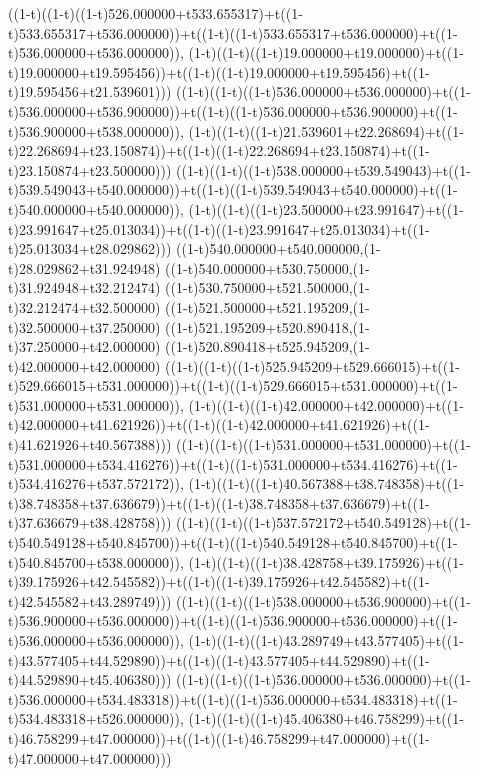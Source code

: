((1-t)((1-t)((1-t)526.000000+t533.655317)+t((1-t)533.655317+t536.000000))+t((1-t)((1-t)533.655317+t536.000000)+t((1-t)536.000000+t536.000000)),                                     (1-t)((1-t)((1-t)19.000000+t19.000000)+t((1-t)19.000000+t19.595456))+t((1-t)((1-t)19.000000+t19.595456)+t((1-t)19.595456+t21.539601)))
((1-t)((1-t)((1-t)536.000000+t536.000000)+t((1-t)536.000000+t536.900000))+t((1-t)((1-t)536.000000+t536.900000)+t((1-t)536.900000+t538.000000)),                                     (1-t)((1-t)((1-t)21.539601+t22.268694)+t((1-t)22.268694+t23.150874))+t((1-t)((1-t)22.268694+t23.150874)+t((1-t)23.150874+t23.500000)))
((1-t)((1-t)((1-t)538.000000+t539.549043)+t((1-t)539.549043+t540.000000))+t((1-t)((1-t)539.549043+t540.000000)+t((1-t)540.000000+t540.000000)),                                     (1-t)((1-t)((1-t)23.500000+t23.991647)+t((1-t)23.991647+t25.013034))+t((1-t)((1-t)23.991647+t25.013034)+t((1-t)25.013034+t28.029862)))
((1-t)540.000000+t540.000000,(1-t)28.029862+t31.924948)
((1-t)540.000000+t530.750000,(1-t)31.924948+t32.212474)
((1-t)530.750000+t521.500000,(1-t)32.212474+t32.500000)
((1-t)521.500000+t521.195209,(1-t)32.500000+t37.250000)
((1-t)521.195209+t520.890418,(1-t)37.250000+t42.000000)
((1-t)520.890418+t525.945209,(1-t)42.000000+t42.000000)
((1-t)((1-t)((1-t)525.945209+t529.666015)+t((1-t)529.666015+t531.000000))+t((1-t)((1-t)529.666015+t531.000000)+t((1-t)531.000000+t531.000000)),                                     (1-t)((1-t)((1-t)42.000000+t42.000000)+t((1-t)42.000000+t41.621926))+t((1-t)((1-t)42.000000+t41.621926)+t((1-t)41.621926+t40.567388)))
((1-t)((1-t)((1-t)531.000000+t531.000000)+t((1-t)531.000000+t534.416276))+t((1-t)((1-t)531.000000+t534.416276)+t((1-t)534.416276+t537.572172)),                                     (1-t)((1-t)((1-t)40.567388+t38.748358)+t((1-t)38.748358+t37.636679))+t((1-t)((1-t)38.748358+t37.636679)+t((1-t)37.636679+t38.428758)))
((1-t)((1-t)((1-t)537.572172+t540.549128)+t((1-t)540.549128+t540.845700))+t((1-t)((1-t)540.549128+t540.845700)+t((1-t)540.845700+t538.000000)),                                     (1-t)((1-t)((1-t)38.428758+t39.175926)+t((1-t)39.175926+t42.545582))+t((1-t)((1-t)39.175926+t42.545582)+t((1-t)42.545582+t43.289749)))
((1-t)((1-t)((1-t)538.000000+t536.900000)+t((1-t)536.900000+t536.000000))+t((1-t)((1-t)536.900000+t536.000000)+t((1-t)536.000000+t536.000000)),                                     (1-t)((1-t)((1-t)43.289749+t43.577405)+t((1-t)43.577405+t44.529890))+t((1-t)((1-t)43.577405+t44.529890)+t((1-t)44.529890+t45.406380)))
((1-t)((1-t)((1-t)536.000000+t536.000000)+t((1-t)536.000000+t534.483318))+t((1-t)((1-t)536.000000+t534.483318)+t((1-t)534.483318+t526.000000)),                                     (1-t)((1-t)((1-t)45.406380+t46.758299)+t((1-t)46.758299+t47.000000))+t((1-t)((1-t)46.758299+t47.000000)+t((1-t)47.000000+t47.000000)))
